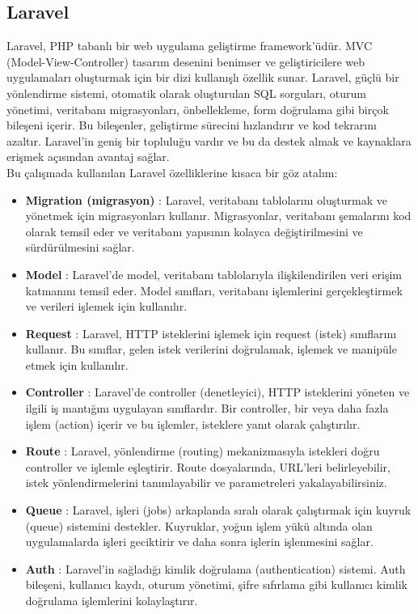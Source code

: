 \subsection{Laravel}
Laravel, PHP tabanlı bir web uygulama geliştirme framework'üdür. MVC (Model-View-Controller) tasarım desenini benimser ve geliştiricilere web uygulamaları oluşturmak için bir dizi kullanışlı özellik sunar. Laravel, güçlü bir yönlendirme sistemi, otomatik olarak oluşturulan SQL sorguları, oturum yönetimi, veritabanı migrasyonları, önbellekleme, form doğrulama gibi birçok bileşeni içerir. Bu bileşenler, geliştirme sürecini hızlandırır ve kod tekrarını azaltır. Laravel'in geniş bir topluluğu vardır ve bu da destek almak ve kaynaklara erişmek açısından avantaj sağlar.\\
Bu çalışmada kullanılan Laravel özelliklerine kısaca bir göz atalım:
\begin{itemize}
  \item \textbf{Migration (migrasyon)} : Laravel, veritabanı tablolarını oluşturmak ve yönetmek için migrasyonları kullanır. Migrasyonlar, veritabanı şemalarını kod olarak temsil eder ve veritabanı yapısının kolayca değiştirilmesini ve sürdürülmesini sağlar.
  \item \textbf{Model} : Laravel'de model, veritabanı tablolarıyla ilişkilendirilen veri erişim katmanını temsil eder. Model sınıfları, veritabanı işlemlerini gerçekleştirmek ve verileri işlemek için kullanılır.
  \item \textbf{Request} :  Laravel, HTTP isteklerini işlemek için request (istek) sınıflarını kullanır. Bu sınıflar, gelen istek verilerini doğrulamak, işlemek ve manipüle etmek için kullanılır.
  \item \textbf{Controller} : Laravel'de controller (denetleyici), HTTP isteklerini yöneten ve ilgili iş mantığını uygulayan sınıflardır. Bir controller, bir veya daha fazla işlem (action) içerir ve bu işlemler, isteklere yanıt olarak çalıştırılır.
  \item \textbf{Route} : Laravel, yönlendirme (routing) mekanizmasıyla istekleri doğru controller ve işlemle eşleştirir. Route dosyalarında, URL'leri belirleyebilir, istek yönlendirmelerini tanımlayabilir ve parametreleri yakalayabilirsiniz.
  \item \textbf{Queue} : Laravel, işleri (jobs) arkaplanda sıralı olarak çalıştırmak için kuyruk (queue) sistemini destekler. Kuyruklar, yoğun işlem yükü altında olan uygulamalarda işleri geciktirir ve daha sonra işlerin işlenmesini sağlar.
  \item \textbf{Auth} : Laravel'in sağladığı kimlik doğrulama (authentication) sistemi. Auth bileşeni, kullanıcı kaydı, oturum yönetimi, şifre sıfırlama gibi kullanıcı kimlik doğrulama işlemlerini kolaylaştırır.

\end{itemize}
